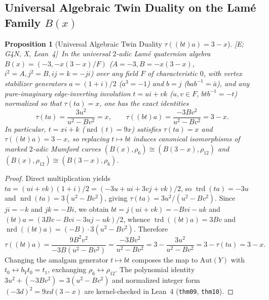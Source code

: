 \documentclass[11pt]{amsart}
\numberwithin{equation}{section}
\theoremstyle{plain}
\newtheorem{proposition}[theorem]{Proposition}
\theoremstyle{definition}\newtheorem{definition}[theorem]{Definition}
\theoremstyle{remark}\newtheorem{remark}[theorem]{Remark}
\newcommand{\Aut}{\mathrm{Aut}}
\newcommand{\nrd}{\operatorname{nrd}}
\newcommand{\trd}{\operatorname{trd}}
\newcommand{\ctag}[1]{\textup{\textsf{\scriptsize[#1]}}}
\begin{document}
\subsection{Universal Algebraic Twin Duality on the Lam\'e Family \texorpdfstring{$B(x)$}{B(x)}}\label{sec:twin_duality}
\begin{proposition}[Universal Algebraic Twin Duality $\tau((bt)a) = 3 - x$]\label{prop:twin_duality}
\ctag{E; G4N, X, Lean~4}\ In the universal $2$-adic Lam\'e quaternion algebra $B(x) = (-3, -x(3-x)/F)$ ($A=-3, B=-x(3-x)$, $i^2=A, j^2=B, ij=k=-ji$) over any field $F$ of characteristic $0$, with vertex stabilizer generators $a=(1+i)/2$ ($a^3=-1$) and $b=j$ ($bab^{-1}=\bar a$), and any pure-imaginary edge-inverting involution $t = ui + vk$ ($u,v\in F$, $btb^{-1}=-t$) normalized so that $\tau(ta)=x$, one has the exact identities
\begin{equation}\label{eq:twin_duality}
\tau(ta) = \frac{3u^2}{u^2 - Bv^2} = x, \qquad \tau((bt)a) = \frac{-3Bv^2}{u^2 - Bv^2} = 3 - x.
\end{equation}
In particular, $t = xi + k$ ($\nrd(t)=9x$) satisfies $\tau(ta)=x$ and $\tau((bt)a)=3-x$, so replacing $t \mapsto bt$ induces canonical isomorphisms of marked $2$-adic Mumford curves $(B(x),\rho_6) \cong (B(3-x),\rho_{12})$ and $(B(x),\rho_{12}) \cong (B(3-x),\rho_6)$.
\end{proposition}
\begin{proof}
Direct multiplication yields $ta = (ui+vk)(1+i)/2 = (-3u + ui + 3vj + vk)/2$, so $\trd(ta)=-3u$ and $\nrd(ta) = 3(u^2 - Bv^2)$, giving $\tau(ta) = 3u^2/(u^2 - Bv^2)$. Since $ji=-k$ and $jk=-Bi$, we obtain $bt = j(ui+vk) = -Bvi - uk$ and $(bt)a = (3Bv - Bvi - 3uj - uk)/2$, whence $\trd((bt)a) = 3Bv$ and $\nrd((bt)a) = (-B)\cdot 3(u^2 - Bv^2)$. Therefore
\[
\tau((bt)a) = \frac{9B^2 v^2}{-3B(u^2 - Bv^2)} = \frac{-3Bv^2}{u^2 - Bv^2} = 3 - \frac{3u^2}{u^2 - Bv^2} = 3 - \tau(ta) = 3 - x.
\]
Changing the amalgam generator $t \mapsto bt$ composes the map to $\Aut(Y)$ with $t_0 \leftrightarrow b_Y t_0 = t_1$, exchanging $\rho_6 \leftrightarrow \rho_{12}$. The polynomial identity $3u^2 + (-3Bv^2) = 3(u^2-Bv^2)$ and normalized integer form $(-3d)^2 = 9xd(3-x)$ are kernel-checked in Lean~4 (\texttt{thm09}, \texttt{thm10}).
\end{proof}
\end{document}
